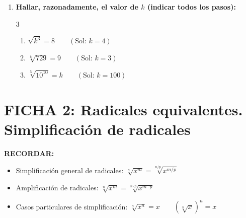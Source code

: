 \documentclass[10pt, a4paper]{article}
\newenvironment{boxsummary}{%
  \def\FrameCommand{\fcolorbox{black}{graybox}}%
  \MakeFramed{\FrameRestore}%
  \small\textbf{RECORDAR:}\par\smallskip
}{%
  \endMakeFramed
}
\begin{document}
\begin{enumerate}[start=4]
    \item \textbf{Hallar, razonadamente, el valor de $k$ (indicar todos los pasos):}
    \begin{multicol}{3}
    \begin{enumerate}[label=\alph*)]
        \item $\sqrt{k^3} = 8 \qquad (\text{Sol: } k=4)$
        \item $\sqrt[k]{729} = 9 \qquad (\text{Sol: } k=3)$
        \item $\sqrt[5]{10^{10}} = k \qquad (\text{Sol: } k=100)$
    \end{enumerate}
    \end{multicol}
\end{enumerate}

\newpage

\section*{FICHA 2: Radicales equivalentes. Simplificación de radicales}

\begin{boxsummary}
\begin{itemize}[leftmargin=*, itemsep=2pt]
    \item Simplificación general de radicales: $\sqrt[n]{x^m} = \sqrt[n/p]{x^{m/p}}$
    \item Amplificación de radicales: $\sqrt[n]{x^m} = \sqrt[n \cdot p]{x^{m \cdot p}}$
    \item Casos particulares de simplificación: $\sqrt[n]{x^n} = x \qquad (\sqrt[n]{x})^n = x$
\end{itemize}
\end{boxsummary}
\end{document}
